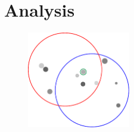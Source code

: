 \documentclass[11pt]{article}
\begin{document}
\section{Analysis}

\begin{figure}[t]
\setlength{\abovecaptionskip}{0pt}

\centering







\includegraphics[width=0.4\textwidth]{imgs/Fig2_SPC.pdf}

\vspace{1em}


\end{figure}
\end{document}
